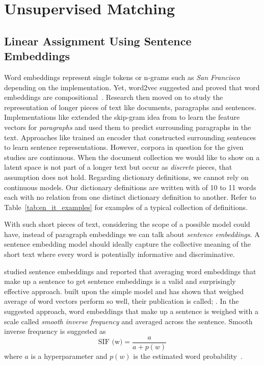 \chapter{Unsupervised Matching}%
\label{chap:unsupervised_matching}

\section{Linear Assignment Using Sentence Embeddings}%
\label{sec:linear_assignment_using_sentence_embeddings}

Word embeddings represent single tokens or n-grams such as \emph{San Francisco} depending on the implementation.
Yet, word2vec suggested and proved that word embeddings are compositional~\cite{mikolov_distributed_2013}.
Research then moved on to study the representation of longer pieces of text like documents, paragraphs and sentences.
Implementations like \textcite{le_distributed_2014} extended the skip-gram idea from \textcite{mikolov_distributed_2013} to learn the feature vectors for \emph{paragraphs} and used them to predict surrounding paragraphs in the text.
Approaches like \textcite{kiros_skip-thought_2015} trained an encoder that constructed surrounding sentences to learn sentence representations.
However, corpora in question for the given studies are continuous.
When the document collection we would like to show on a latent space is not part of a longer text but occur as \emph{discrete} pieces, that assumption does not hold.
Regarding dictionary definitions, we cannot rely on continuous models.
Our dictionary definitions are written with of 10 to 11 words each with no relation from one distinct dictionary definition to another.
Refer to Table~\ref{tab:en_it_examples} for examples of a typical collection of definitions.

With such short pieces of text, considering the scope of a possible model could have, instead of paragraph embeddings we can talk about \emph{sentence embeddings}.
A sentence embedding model should ideally capture the collective meaning of the short text where every word is potentially informative and discriminative.

\textcite{wieting_towards_2015} studied sentence embeddings and reported that averaging word embeddings that make up a sentence to get sentence embeddings is a valid and surprisingly effective approach.
\textcite{arora_simple_2016} built upon the simple model and has shown that weighed average of word vectors perform so well, their publication is called; .
In the suggested approach, word embeddings that make up a sentence is weighed with a scale called \emph{smooth inverse frequency} and averaged across the sentence.
Smooth inverse frequency is suggested as
\begin{displaymath}
    \text{SIF (w)} = \frac{a}{a + p(w)}
\end{displaymath}
where $a$ is a hyperparameter and $p(w)$ is the estimated word probability~\cite{arora_simple_2016}.

